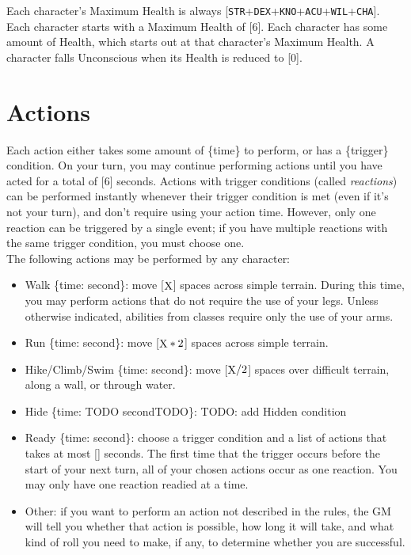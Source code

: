 \documentclass[12pt]{article}
\newcommand{\STR}{\texttt{STR}}
\newcommand{\DEX}{\texttt{DEX}}
\newcommand{\KNO}{\texttt{KNO}}
\newcommand{\ACU}{\texttt{ACU}}
\newcommand{\WIL}{\texttt{WIL}}
\newcommand{\CHA}{\texttt{CHA}}
\newcommand{\X}{\text{{\lower 0.2mm \hbox{X}}}}
\newcommand{\TIME}[1]{\{time: #1 second\if1#1{}\else{s}\fi\}}
\begin{document}
Each character's Maximum Health is always [\STR+\DEX+\KNO+\ACU+\WIL+\CHA]. Each character starts with a Maximum Health of [6].
Each character has some amount of Health, which starts out at that character's Maximum Health. A character falls Unconscious when its Health is reduced to [0].

\pagebreak
\section{Actions}

Each action either takes some amount of \{time\} to perform, or has a \{trigger\} condition. On your turn, you may continue performing actions until you have acted for a total of [6] seconds. Actions with trigger conditions (called \textit{reactions}) can be performed instantly whenever their trigger condition is met (even if it’s not your turn), and don’t require using your action time. However, only one reaction can be triggered by a single event; if you have multiple reactions with the same trigger condition, you must choose one.
\\[5mm]
The following actions may be performed by any character:
\begin{itemize}

\item Walk \TIME{\X}: move [$\X$] spaces across simple terrain. During this time, you may perform actions that do not require the use of your legs. Unless otherwise indicated, abilities from classes require only the use of your arms.

\item Run \TIME{\X}: move [$\X * 2$] spaces across simple terrain.

\item Hike/Climb/Swim \TIME{\X}: move [$\X / 2$] spaces over difficult terrain, along a wall, or through water.

\item Hide \TIME{TODO}: TODO: add Hidden condition

\item Ready \TIME{\X}: choose a trigger condition and a list of actions that takes at most [\X] seconds. The first time that the trigger occurs before the start of your next turn, all of your chosen actions occur as one reaction. You may only have one reaction readied at a time.

\item Other: if you want to perform an action not described in the rules, the GM will tell you whether that action is possible, how long it will take, and what kind of roll you need to make, if any, to determine whether you are successful.

\end{itemize}
\end{document}
